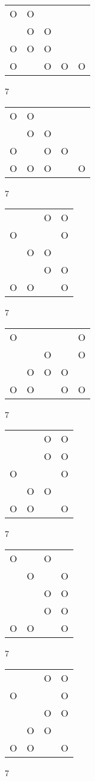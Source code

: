 \begin{tabular}{|m{0.2cm}m{0.2cm}m{0.2cm}m{0.2cm}m{0.2cm}|}\hline
O&O& & & \\
 &O&O& & \\
O&O&O& & \\
O& &O&O&O\\
\hline\end{tabular}7
\begin{tabular}{|m{0.2cm}m{0.2cm}m{0.2cm}m{0.2cm}m{0.2cm}|}\hline
O&O& & & \\
 &O&O& & \\
O& &O&O& \\
O&O&O& &O\\
\hline\end{tabular}7
\begin{tabular}{|m{0.2cm}m{0.2cm}m{0.2cm}m{0.2cm}|}\hline
 & &O&O\\
O& & &O\\
 &O&O& \\
 & &O&O\\
O&O& &O\\
\hline\end{tabular}7
\begin{tabular}{|m{0.2cm}m{0.2cm}m{0.2cm}m{0.2cm}m{0.2cm}|}\hline
O& & & &O\\
 & &O& &O\\
 &O&O&O& \\
O&O& &O&O\\
\hline\end{tabular}7
\begin{tabular}{|m{0.2cm}m{0.2cm}m{0.2cm}m{0.2cm}|}\hline
 & &O&O\\
 & &O&O\\
O& & &O\\
 &O&O& \\
O&O& &O\\
\hline\end{tabular}7
\begin{tabular}{|m{0.2cm}m{0.2cm}m{0.2cm}m{0.2cm}|}\hline
O& &O& \\
 &O& &O\\
 & &O&O\\
 & &O&O\\
O&O& &O\\
\hline\end{tabular}7
\begin{tabular}{|m{0.2cm}m{0.2cm}m{0.2cm}m{0.2cm}|}\hline
 & &O&O\\
O& & &O\\
 & &O&O\\
 &O&O& \\
O&O& &O\\
\hline\end{tabular}7
